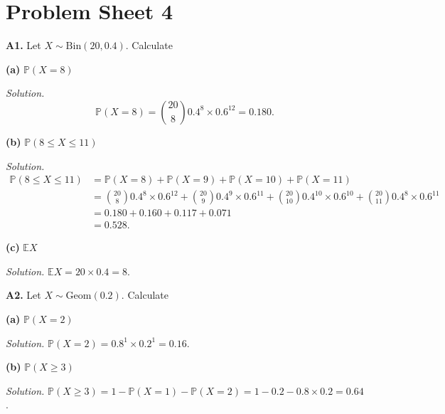 \documentclass[
  a4paper,
]{book}
\theoremstyle{definition}
\theoremstyle{definition}
\theoremstyle{definition}
\theoremstyle{definition}
\theoremstyle{remark}
\begin{document}
\hypertarget{P4-solutions}{%
\section*{Problem Sheet 4}\label{P4-solutions}}

\textbf{A1.} Let \(X \sim \text{Bin}(20, 0.4)\). Calculate

\textbf{(a)} \(\mathbb P(X = 8)\)

\begin{myanswers}
\emph{Solution.}
\[ \mathbb P(X = 8) = \binom{20}{8} 0.4^8 \times 0.6^{12} = 0.180 . \]

\end{myanswers}

\textbf{(b)} \(\mathbb P(8 \leq X \leq 11)\)

\begin{myanswers}
\emph{Solution.}
\begin{align*}
\mathbb P(8 \leq X \leq 11) &= \mathbb P(X = 8) + \mathbb P(X = 9) + \mathbb P(X = 10) + \mathbb P(X = 11) \\ 
&= \binom{20}{8} 0.4^8 \times 0.6^{12} + \binom{20}{9} 0.4^9 \times 0.6^{11} + \binom{20}{10} 0.4^10 \times 0.6^{10} + \binom{20}{11} 0.4^8 \times 0.6^{11} \\
&= 0.180 + 0.160 + 0.117 + 0.071 \\
&= 0.528 .
\end{align*}

\end{myanswers}

\textbf{(c)} \(\mathbb EX\)

\begin{myanswers}
\emph{Solution.} \(\mathbb EX = 20 \times 0.4 = 8\).

\end{myanswers}

\textbf{A2.} Let \(X \sim \text{Geom}(0.2)\). Calculate

\textbf{(a)} \(\mathbb P(X = 2)\)

\begin{myanswers}
\emph{Solution.} \(\mathbb P(X = 2) = 0.8^1 \times 0.2^1 = 0.16\).

\end{myanswers}

\textbf{(b)} \(\mathbb P(X \geq 3)\)

\begin{myanswers}
\emph{Solution.} \(\mathbb P(X \geq 3) = 1 - \mathbb P(X =1) - \mathbb P(X = 2) = 1 - 0.2 - 0.8\times 0.2 = 0.64\).

\end{myanswers}
\end{document}
